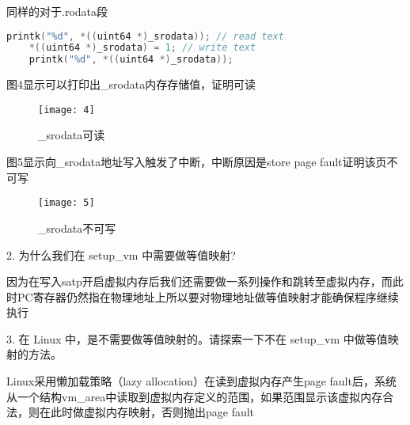 \documentclass{source/Report}
\begin{document}
同样的对于.rodata段

\begin{lstlisting}[language = c, title = {测试代码}]
    printk("%d", *((uint64 *)_srodata)); // read text
    *((uint64 *)_srodata) = 1; // write text
    printk("%d", *((uint64 *)_srodata));
\end{lstlisting}

图4显示可以打印出\_srodata内存存储值，证明可读

\begin{figure}[p]
    \centering
    \texttt{[image: 4]}
    \caption{\_srodata可读}
\end{figure}

图5显示向\_srodata地址写入触发了中断，中断原因是store page fault证明该页不可写

\begin{figure}[p]
    \centering
    \texttt{[image: 5]}
    \caption{\_srodata不可写}
\end{figure}

2. 为什么我们在 setup\_vm 中需要做等值映射?

因为在写入satp开启虚拟内存后我们还需要做一系列操作和跳转至虚拟内存，而此时PC寄存器仍然指在物理地址上所以要对物理地址做等值映射才能确保程序继续执行

3. 在 Linux 中，是不需要做等值映射的。请探索一下不在 setup\_vm 中做等值映射的方法。

Linux采用懒加载策略（lazy allocation）在读到虚拟内存产生page fault后，系统从一个结构vm\_area中读取到虚拟内存定义的范围，如果范围显示该虚拟内存合法，则在此时做虚拟内存映射，否则抛出page fault
\end{document}
